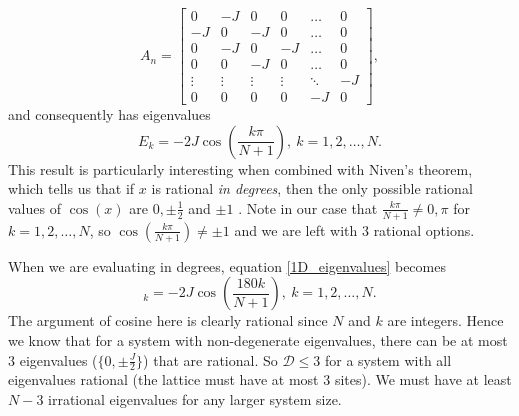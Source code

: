 \documentclass[a4paper,10pt]{article}
\begin{document}
\begin{equation}
 A_n= \begin{bmatrix}
 0 & -J & 0 & 0&\dots & 0\\
 -J & 0 & -J & 0&\dots & 0\\
 0 & -J & 0 & -J& \dots & 0\\
 0 & 0 & -J & 0& \dots & 0\\
 \vdots & \vdots & \vdots&\vdots & \ddots & -J\\
 0 & 0 & 0 & 0 & -J & 0
 \end{bmatrix},
\end{equation}
and consequently has eigenvalues
\begin{equation}
\label{1D_eigenvalues}
 E_k=-2J\cos\left(\frac{k\pi}{N+1}\right), \ k=1,2,\dots,N.
\end{equation}
This result is particularly interesting when combined with Niven's theorem, which tells us that if $x$ is
rational \textit{in degrees}, then the only possible rational values of $\cos(x)$ are $0, \pm \frac{1}{2}$ and $\pm 1$ \cite{Niven2005}. Note in our case that $\frac{k\pi}{N+1}\neq 0, \pi$
for $k=1,2,\dots,N$, so $\cos(\frac{k\pi}{N+1})\neq\pm1$ and we are left with $3$ rational options.

When we are evaluating in degrees, equation \ref{1D_eigenvalues} becomes
\begin{equation}
 _k=-2J\cos\left(\frac{180k}{N+1}\right), \ k=1,2,\dots,N.
\end{equation}
The argument of cosine here is clearly rational since $N$ and $k$ are integers. Hence we know that for a system with non-degenerate eigenvalues, there can be at most $3$ eigenvalues ($\{0,\pm\frac{J}{2}\}$)
that are rational. So $\mathcal{D}\leq3$ for a system with all eigenvalues rational (the lattice must have at most $3$ sites). We must have at least $N-3$ irrational eigenvalues for any larger system size. 




\newpage






\end{document}
